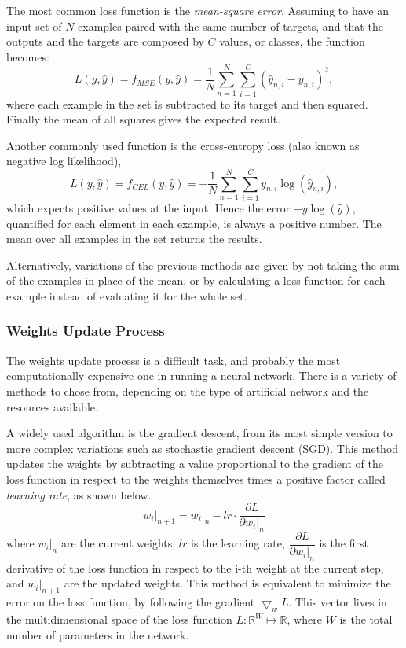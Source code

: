 The most common loss function is the \textit{mean-square error}.
Assuming to have an input set of $N$ examples paired with the same number of targets, and that the outputs and the targets are composed by $C$ values, or classes, the function becomes:
\begin{equation}
	L(y, \hat{y}) = f_{MSE}(y, \hat{y}) = \frac{1}{N} \sum_{n=1}^N \sum_{i=1}^C \left( \hat{y}_{n,i} - y_{n,i} \right)^2,
\end{equation}
where each example in the set is subtracted to its target and then squared.
Finally the mean of all squares gives the expected result.

Another commonly used function is the cross-entropy loss (also known as negative log likelihood),
\begin{equation}
	L(y, \hat{y}) = f_{CEL}(y, \hat{y}) = - \frac{1}{N} \sum_{n=1}^N \sum_{i=1}^C y_{n,i} \log \left( \hat{y}_{n,i} \right),
\end{equation}
which expects positive values at the input.
Hence the error $-y\log \left( \hat{y} \right)$, quantified for each element in each example, is always a positive number.
The mean over all examples in the set returns the results.

Alternatively, variations of the previous methods are given by not taking the sum of the examples in place of the mean, or by calculating a loss function for each example instead of evaluating it for the whole set.

\subsubsection{Weights Update Process}
\label{sssec:Weights_Update_Process}

The weights update process is a difficult task, and probably the most computationally expensive one in running a neural network.
There is a variety of methods to chose from, depending on the type of artificial network and the resources available.

A widely used algorithm is the gradient descent, from its most simple version to more complex variations such as stochastic gradient descent (SGD).
This method updates the weights by subtracting a value proportional to the gradient of the loss function in respect to the weights themselves times a positive factor called \textit{learning rate}, as shown below.
\begin{equation}
	\left.w_i\right|_{n+1} = \left.w_i\right|_n - lr \cdot \frac{\partial L}{\partial \left.w_i\right|_n}
\end{equation}
where $\left.w_i\right|_{n}$ are the current weights, $lr$ is the learning rate, $\dfrac{\partial L}{\partial \left.w_i\right|_n}$ is the first derivative of the loss function in respect to the i-th weight at the current step, and $\left.w_i\right|_{n+1}$ are the updated weights.
This method is equivalent to minimize the error on the loss function, by following the gradient $\bigtriangledown_w L$.
This vector lives in the multidimensional space of the loss function $L:\mathbb{R}^W \mapsto \mathbb{R}$, where $W$ is the total number of parameters in the network.

